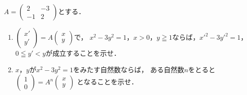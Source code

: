 \documentclass[../../main.tex]{subfiles}
\begin{document}
$A=
\begin{pmatrix} 2 & -3 \\ -1 & 2
\end{pmatrix}$とする．
\begin{enumerate}
  \item $
    \begin{pmatrix} x' \\ y'
    \end{pmatrix}=A
    \begin{pmatrix} x \\ y
    \end{pmatrix}$で，
    $x^2-3y^2=1$，$x>0$，$y\geqq1$ならば，${x'}^2-3{y'}^2=1$，$0 \leqq y' < y$が成立することを示せ．
  \item $x$，$y$が$x^2-3y^2=1$をみたす自然数ならば，
    ある自然数$n$をとると
    $
    \begin{pmatrix} 1 \\ 0
    \end{pmatrix}=A^n
    \begin{pmatrix} x \\ y
    \end{pmatrix}$
    となることを示せ．
\end{enumerate}
\end{document}
